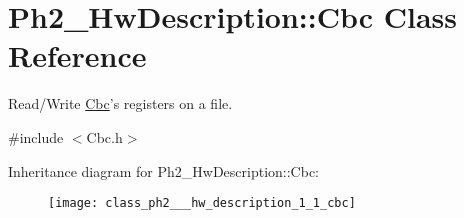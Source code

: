 \hypertarget{class_ph2___hw_description_1_1_cbc}{\section{Ph2\-\_\-\-Hw\-Description\-:\-:Cbc Class Reference}
\label{class_ph2___hw_description_1_1_cbc}
}


Read/\-Write \hyperlink{class_ph2___hw_description_1_1_cbc}{Cbc}'s registers on a file.  




{\ttfamily \#include $<$Cbc.\-h$>$}

Inheritance diagram for Ph2\-\_\-\-Hw\-Description\-:\-:Cbc\-:\begin{figure}[H]
\begin{center}
\leavevmode
\texttt{[image: class\_ph2\_\_\_hw\_description\_1\_1\_cbc]}
\end{center}
\end{figure}
